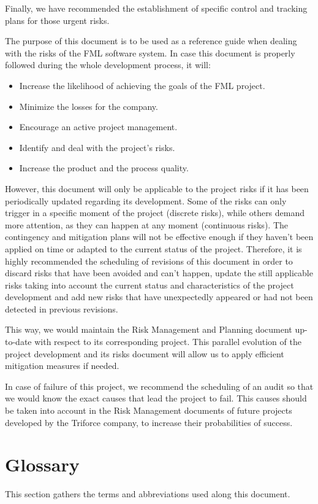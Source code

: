 \documentclass[11pt]{report}
\newcounter{risks}[subsection]
\begin{document}
Finally, we have recommended the establishment of specific control and tracking plans for those urgent risks.

The purpose of this document is to be used as a reference guide when dealing with the risks of the FML software system. In case this document is properly followed during the whole development process, it will:

\begin{itemize}
\item Increase the likelihood of achieving the goals of the FML project.
\item Minimize the losses for the company.
\item Encourage an active project management.
\item Identify and deal with the project's risks.
\item Increase the product and the process quality.
\end{itemize}

However, this document will only be applicable to the project risks if it has been periodically updated regarding its development. Some of the risks can only trigger in a specific moment of the project (discrete risks), while others demand more attention, as they can happen at any moment (continuous risks). The contingency and mitigation plans will not be effective enough if they haven't been applied on time or adapted to the current status of the project. Therefore, it is highly recommended the scheduling of revisions of this document in order to discard risks that have been avoided and can't happen, update the still applicable risks taking into account the current status and characteristics of the project development and add new risks that have unexpectedly appeared or had not been detected in previous revisions. 

This way, we would maintain the Risk Management and Planning document up-to-date with respect to its corresponding project. This parallel evolution of the project development and its risks document will allow us to apply efficient mitigation measures if needed. 

In case of failure of this project, we recommend the scheduling of an audit so that we would know the exact causes that lead the project to fail. This causes should be taken into account in the Risk Management documents of future projects developed by the Triforce company, to increase their probabilities of success.
\appendix

\chapter{Glossary}
\label{chapGlossary}
This section gathers the terms and abbreviations used along this document.
\end{document}
